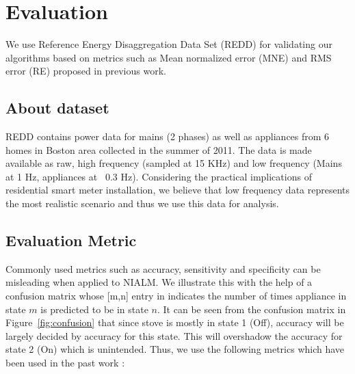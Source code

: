 \documentclass[conference]{IEEEtran}
\newcommand{\figref}[1]{Figure~\ref{#1}}
\begin{document}
\section{Evaluation}

\noindent We use Reference Energy Disaggregation Data Set (REDD) \cite{redd} for validating our algorithms based on metrics such as Mean normalized error (MNE) and RMS error (RE) proposed in previous work.
\subsection{About dataset}
\noindent REDD contains power data for mains (2 phases) as well as appliances from 6 homes in Boston area collected in the summer of 2011. The data is made available as raw, high frequency (sampled at 15 KHz) and low frequency (Mains at 1 Hz, appliances at ~0.3 Hz). Considering the practical implications of residential smart meter installation, we believe that low frequency data represents the most realistic scenario and thus we use this data for analysis. 



%	
%
\subsection{Evaluation Metric}

\noindent Commonly used metrics such as accuracy, sensitivity and specificity can be misleading when applied to NIALM. We illustrate this with the help of a confusion matrix whose [m,n] entry in indicates the number of times appliance in state $m$ is predicted to be in state $n$. It can be seen from the confusion matrix in \figref{fig:confusion} that since stove is mostly in state 1 (Off), accuracy will be largely decided by accuracy for this state. This will overshadow the accuracy for state 2 (On) which is unintended.
Thus, we use the following metrics which have been used in the past work \cite{parson2012_aaai,redd}:
\end{document}
